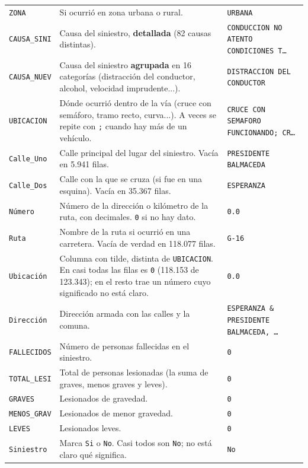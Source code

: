 \documentclass[10.5pt]{article}
\begin{document}
\begin{xltabular}{\linewidth}{@{}p{4.5cm} >{\raggedright\arraybackslash}X p{3.4cm}@{}}
\texttt{ZONA} & Si ocurrió en zona urbana o rural. & \texttt{URBANA} \\
\texttt{CAUSA\_\allowbreak{}SINI} & Causa del siniestro, \textbf{detallada} (82 causas distintas). & \texttt{CONDUCCION NO ATENTO CONDICIONES T…} \\
\texttt{CAUSA\_\allowbreak{}NUEV} & Causa del siniestro \textbf{agrupada} en 16 categorías (distracción del conductor, alcohol, velocidad imprudente...). & \texttt{DISTRACCION DEL CONDUCTOR} \\
\texttt{UBICACION} & Dónde ocurrió dentro de la vía (cruce con semáforo, tramo recto, curva...). A veces se repite con \texttt{;} cuando hay más de un vehículo. & \texttt{CRUCE CON SEMAFORO FUNCIONANDO; CR…} \\
\texttt{Calle\_\allowbreak{}Uno} & Calle principal del lugar del siniestro. Vacía en 5.941 filas. & \texttt{PRESIDENTE BALMACEDA} \\
\texttt{Calle\_\allowbreak{}Dos} & Calle con la que se cruza (si fue en una esquina). Vacía en 35.367 filas. & \texttt{ESPERANZA} \\
\texttt{Número} & Número de la dirección o kilómetro de la ruta, con decimales. \texttt{0} si no hay dato. & \texttt{0.0} \\
\texttt{Ruta} & Nombre de la ruta si ocurrió en una carretera. Vacía de verdad en 118.077 filas. & \texttt{G-16} \\
\texttt{Ubicación} & Columna con tilde, distinta de \texttt{UBICACION}. En casi todas las filas es \texttt{0} (118.153 de 123.343); en el resto trae un número cuyo significado no está claro. & \texttt{0.0} \\
\texttt{Dirección} & Dirección armada con las calles y la comuna. & \texttt{ESPERANZA \& PRESIDENTE BALMACEDA, …} \\
\texttt{FALLECIDOS} & Número de personas fallecidas en el siniestro. & \texttt{0} \\
\texttt{TOTAL\_\allowbreak{}LESI} & Total de personas lesionadas (la suma de graves, menos graves y leves). & \texttt{0} \\
\texttt{GRAVES} & Lesionados de gravedad. & \texttt{0} \\
\texttt{MENOS\_\allowbreak{}GRAV} & Lesionados de menor gravedad. & \texttt{0} \\
\texttt{LEVES} & Lesionados leves. & \texttt{0} \\
\texttt{Siniestro} & Marca \texttt{Si} o \texttt{No}. Casi todos son \texttt{No}; no está claro qué significa. & \texttt{No} \\

\end{xltabular}
\end{document}
